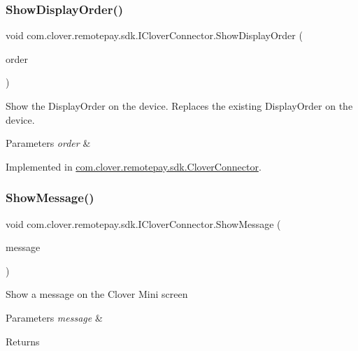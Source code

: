 \subsubsection{\texorpdfstring{Show\+Display\+Order()}{ShowDisplayOrder()}}
{\footnotesize\ttfamily void com.\+clover.\+remotepay.\+sdk.\+I\+Clover\+Connector.\+Show\+Display\+Order (\begin{DoxyParamCaption}\item[{\hyperlink{classcom_1_1clover_1_1remote_1_1order_1_1_display_order}{Display\+Order}}]{order }\end{DoxyParamCaption})}



Show the Display\+Order on the device. Replaces the existing Display\+Order on the device. 


\begin{DoxyParams}{Parameters}
{\em order} & \\
\hline
\end{DoxyParams}


Implemented in \hyperlink{classcom_1_1clover_1_1remotepay_1_1sdk_1_1_clover_connector_abfa384bfc0c016908d137e0332b7e06c}{com.\+clover.\+remotepay.\+sdk.\+Clover\+Connector}.

\mbox{\label{interfacecom_1_1clover_1_1remotepay_1_1sdk_1_1_i_clover_connector_a2d4c2a87f772459bb1a494e2f87835a8}} 
\subsubsection{\texorpdfstring{Show\+Message()}{ShowMessage()}}
{\footnotesize\ttfamily void com.\+clover.\+remotepay.\+sdk.\+I\+Clover\+Connector.\+Show\+Message (\begin{DoxyParamCaption}\item[{string}]{message }\end{DoxyParamCaption})}



Show a message on the Clover Mini screen 


\begin{DoxyParams}{Parameters}
{\em message} & \\
\hline
\end{DoxyParams}
\begin{DoxyReturn}{Returns}

\end{DoxyReturn}


